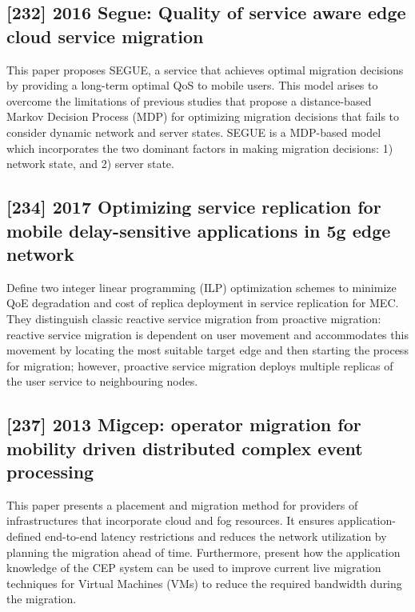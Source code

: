 \subsection{[232] 2016 Segue: Quality of service aware edge cloud service migration}
\label{subsec:paper10} \cite{zhang2016segue}
This paper proposes SEGUE, a service that achieves optimal migration decisions by providing a long-term optimal QoS to mobile users. This model arises to overcome the limitations of previous studies that propose a distance-based Markov Decision Process (MDP) for optimizing migration decisions that fails to consider dynamic network and server states. SEGUE is a MDP-based model which incorporates the two dominant factors in making migration decisions: 1) network state, and 2) server state.

\subsection{[234] 2017 Optimizing service replication for mobile delay-sensitive applications in 5g edge network}
\label{subsec:paper11} \cite{farris2017optimizing}
Define two integer linear programming (ILP) optimization schemes to minimize QoE degradation and cost of replica deployment in service replication for MEC. They distinguish classic reactive service migration from proactive migration: reactive service migration is dependent on user movement and accommodates this movement by locating the most suitable target edge and then starting the process for migration; however, proactive service migration deploys multiple replicas of the user service to neighbouring nodes.

\subsection{[237] 2013 Migcep: operator migration for mobility driven distributed complex event processing}
\label{subsec:paper12} \cite{ottenwalder2013migcep}
This paper presents a placement and migration method for providers of infrastructures that incorporate cloud and fog resources. It ensures application-defined end-to-end latency restrictions and reduces the network utilization by planning the migration ahead of time. Furthermore, present how the application knowledge of the CEP system can be used to improve current live migration techniques for Virtual Machines (VMs) to reduce the required bandwidth during the migration.

